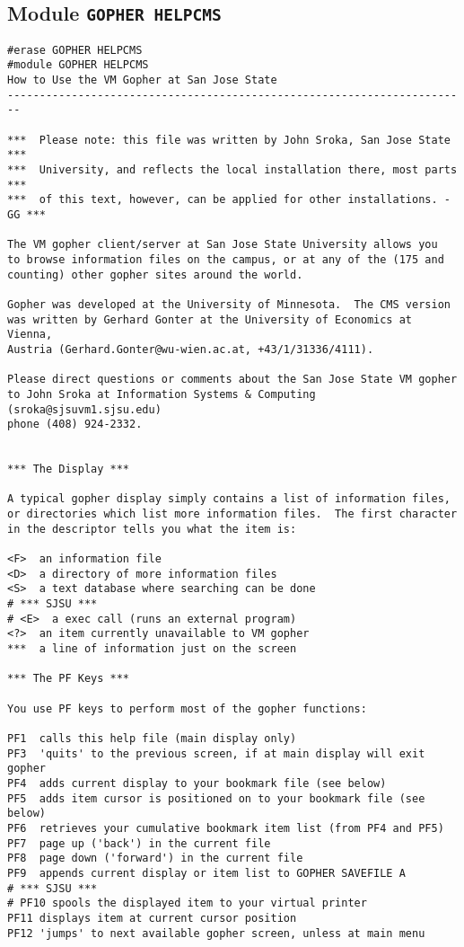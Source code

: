 \subsection{Module {\tt GOPHER HELPCMS}}

\def\LPtopD{Module {\tt GOPHER HELPCMS}}

\def\LPtopF{~}

\begin{verbatim}
#erase GOPHER HELPCMS
#module GOPHER HELPCMS
How to Use the VM Gopher at San Jose State
------------------------------------------------------------------------

***  Please note: this file was written by John Sroka, San Jose State   ***
***  University, and reflects the local installation there, most parts  ***
***  of this text, however, can be applied for other installations. -GG ***

The VM gopher client/server at San Jose State University allows you
to browse information files on the campus, or at any of the (175 and
counting) other gopher sites around the world.

Gopher was developed at the University of Minnesota.  The CMS version
was written by Gerhard Gonter at the University of Economics at Vienna,
Austria (Gerhard.Gonter@wu-wien.ac.at, +43/1/31336/4111).

Please direct questions or comments about the San Jose State VM gopher
to John Sroka at Information Systems & Computing (sroka@sjsuvm1.sjsu.edu)
phone (408) 924-2332.


*** The Display ***

A typical gopher display simply contains a list of information files,
or directories which list more information files.  The first character
in the descriptor tells you what the item is:

<F>  an information file
<D>  a directory of more information files
<S>  a text database where searching can be done
# *** SJSU ***
# <E>  a exec call (runs an external program)
<?>  an item currently unavailable to VM gopher
***  a line of information just on the screen

*** The PF Keys ***

You use PF keys to perform most of the gopher functions:

PF1  calls this help file (main display only)
PF3  'quits' to the previous screen, if at main display will exit gopher
PF4  adds current display to your bookmark file (see below)
PF5  adds item cursor is positioned on to your bookmark file (see below)
PF6  retrieves your cumulative bookmark item list (from PF4 and PF5)
PF7  page up ('back') in the current file
PF8  page down ('forward') in the current file
PF9  appends current display or item list to GOPHER SAVEFILE A
# *** SJSU ***
# PF10 spools the displayed item to your virtual printer
PF11 displays item at current cursor position
PF12 'jumps' to next available gopher screen, unless at main menu


\end{verbatim}
